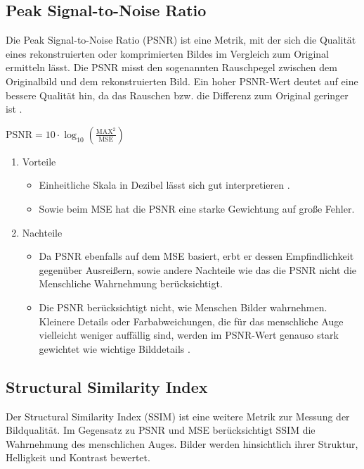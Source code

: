         \subsection{Peak Signal-to-Noise Ratio}
            Die Peak Signal-to-Noise Ratio (PSNR) ist eine Metrik, mit der sich die Qualität eines rekonstruierten oder komprimierten Bildes im Vergleich zum Original ermitteln lässt.
            Die PSNR misst den sogenannten Rauschpegel zwischen dem Originalbild und dem rekonstruierten Bild.
            Ein hoher PSNR-Wert deutet auf eine bessere Qualität hin, da das Rauschen bzw. die Differenz zum Original geringer ist \cite{psnr, psnr2}.
            \begin{center}
                $\text{PSNR} = 10 \cdot \log_{10} \left( \frac{\text{MAX}^2}{\text{MSE}} \right)$
            \end{center}
            \begin{enumerate}
                \item Vorteile
                \begin{itemize}
                    \item Einheitliche Skala in Dezibel lässt sich gut interpretieren \cite{psnr3}.
                    \item Sowie beim MSE hat die PSNR eine starke Gewichtung auf große Fehler.
                \end{itemize}
                \item Nachteile
                \begin{itemize}
                    \item Da PSNR ebenfalls auf dem MSE basiert, erbt er dessen Empfindlichkeit gegenüber Ausreißern, sowie andere Nachteile wie das die PSNR nicht die Menschliche Wahrnehmung berücksichtigt.
                    \item Die PSNR berücksichtigt nicht, wie Menschen Bilder wahrnehmen. Kleinere Details oder Farbabweichungen, die für das menschliche Auge vielleicht weniger auffällig sind, werden im PSNR-Wert genauso stark gewichtet wie wichtige Bilddetails \cite{mse_psnr_eye}.
                \end{itemize}
            \end{enumerate}

\newpage
        \subsection{Structural Similarity Index}
            \cite{ssim_paper}
            Der Structural Similarity Index (SSIM) ist eine weitere Metrik zur Messung der Bildqualität. Im Gegensatz zu PSNR und MSE berücksichtigt SSIM die Wahrnehmung des menschlichen Auges.
            Bilder werden hinsichtlich ihrer Struktur, Helligkeit und Kontrast bewertet.
            
